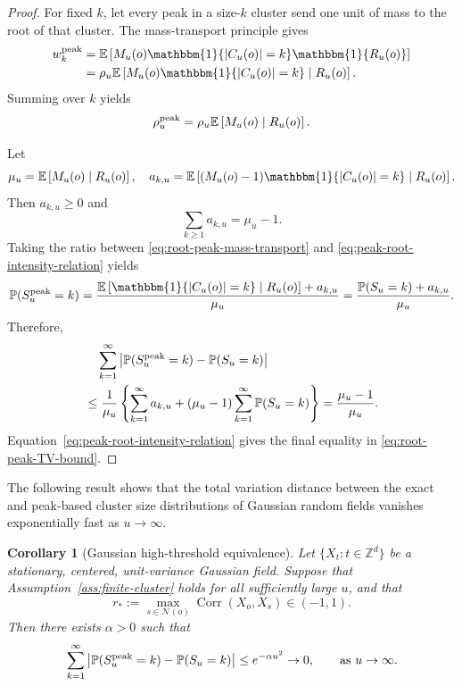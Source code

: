 \documentclass[aap,preprint]{imsart}
\theoremstyle{plain}
\newtheorem{corollary}[theorem]{Corollary}
\theoremstyle{definition}
\def\E{{\mathbb E}}
\def\P{{\mathbb P}}
\def\Z{{\mathbb Z}}
\begin{document}
\begin{proof}
	For fixed $k$, let every peak in a size-$k$ cluster send one unit of mass
	to the root of that cluster.  The mass-transport principle gives
	\begin{equation}\label{eq:root-peak-mass-transport}
		\begin{split}
		w_k^{\rm peak}
		&= \E\left[
		M_u(o)\mathbbm{1}\{|C_u(o)|=k\}\mathbbm{1}\{R_u(o)\}
		\right]\\
		&=
		\rho_u
		\E\left[
		M_u(o)\mathbbm{1}\{|C_u(o)|=k\}\mid R_u(o)
		\right].
	\end{split}
	\end{equation}
	Summing over $k$ yields
	\begin{equation}\label{eq:peak-root-intensity-relation}
		\rho_u^{\rm peak}
		=
		\rho_u\E\left[M_u(o)\mid R_u(o)\right].
	\end{equation}
	
	Let
	\[
	\mu_u=\E\left[M_u(o)\mid R_u(o)\right],\quad
	a_{k,u}
	=
	\E\left[
	(M_u(o)-1)\mathbbm{1}\{|C_u(o)|=k\}\mid R_u(o)
	\right].
	\]
	Then $a_{k,u}\geq0$ and
	\[
	\sum_{k\geq1}a_{k,u}=\mu_u-1.
	\]
	Taking the ratio between \eqref{eq:root-peak-mass-transport} and \eqref{eq:peak-root-intensity-relation} yields
	\[
	\P(S_u^{\rm peak}=k)
	=
	\frac{\E\left[\mathbbm{1}\{|C_u(o)|=k\}\mid R_u(o)
		\right]+a_{k,u}}{\mu_u} = \frac{\P(S_u=k) + a_{k,u}}{\mu_u}.
	\]
	Therefore,
	\begin{align*}
		&\quad \sum_{k=1}^{\infty} \left|
		\P(S_u^{\rm peak}=k)
		-\P(S_u=k)
		\right|\\
		&\leq
		\frac{1}{\mu_u}
		\left\{
		\sum_{k=1}^\infty a_{k,u}
		+
		(\mu_u-1)\sum_{k=1}^\infty \P(S_u=k)
		\right\}=
		\frac{\mu_u-1}{\mu_u}.
	\end{align*}
	Equation~\eqref{eq:peak-root-intensity-relation} gives the final equality
	in \eqref{eq:root-peak-TV-bound}.
\end{proof}

The following result shows that the total variation distance between the exact and peak-based cluster size distributions of Gaussian random fields vanishes exponentially fast as $u\to \infty$.
\begin{corollary}[Gaussian high-threshold equivalence]
	\label{cor:gaussian-root-peak}
	Let $\{X_t:t\in\Z^d\}$ be a stationary, centered, unit-variance Gaussian
	field. Suppose that 
	Assumption~\ref{ass:finite-cluster} holds for all sufficiently large $u$,
	and that
	\begin{equation}\label{eq:r*}
	r_*:=
	\max_{s\in\mathcal N(o)}
	\operatorname{Corr}(X_o,X_s)\in (-1, 1).
    \end{equation}
	Then there exists $\alpha>0$ such that
	\[
	\sum_{k=1}^{\infty} \left|
	\P(S_u^{\rm peak}=k)
	-\P(S_u=k)
	\right| \le e^{-\alpha u^2}
	\to 0,
	\qquad \text{\rm as } u\to\infty.
	\]
\end{corollary}
\end{document}
